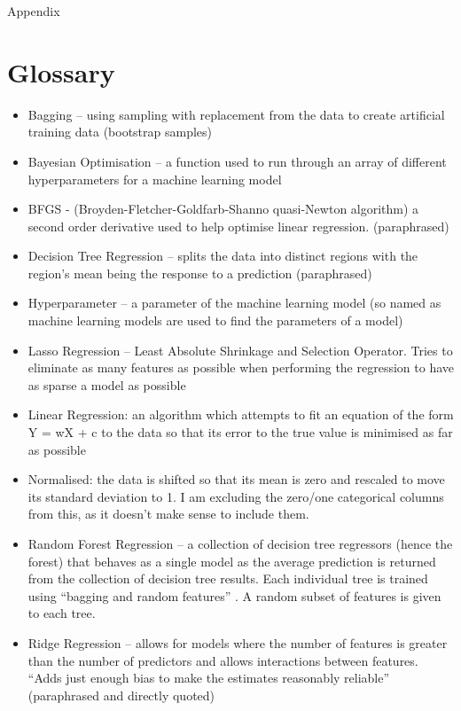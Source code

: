 \documentclass[a4paper,12pt]{article}
\begin{document}
Appendix

\section{Glossary}
\begin{itemize}
	\item Bagging – using sampling with replacement from the data to create artificial training data (bootstrap samples)
	\item Bayesian Optimisation – a function used to run through an array of different hyperparameters for a machine learning model
	\item BFGS - (Broyden-Fletcher-Goldfarb-Shanno quasi-Newton algorithm) a second order derivative used to help optimise linear regression.\citep{brownlee_gentle_2021} (paraphrased)
	\item Decision Tree Regression – splits the data into distinct regions with the region’s mean being the response to a prediction \citep{james_gareth_introduction_2021} (paraphrased)
	\item Hyperparameter – a parameter of the machine learning model (so named as machine learning models are used to find the parameters of a model)
	\item Lasso Regression – Least Absolute Shrinkage and Selection Operator. Tries to eliminate as many features as possible when performing the regression to have as sparse a model as possible \citep{stephanie_lasso_2015}
	\item Linear Regression: an algorithm which attempts to fit an equation of the form Y = wX + c to the data so that its error to the true value is minimised as far as possible
	\item Normalised: the data is shifted so that its mean is zero and rescaled to move its standard deviation to 1. I am excluding the zero/one categorical columns from this, as it doesn’t make sense to include them.
	\item Random Forest Regression – a collection of decision tree regressors (hence the forest) that behaves as a single model as the average prediction is returned from the collection of decision tree results. Each individual tree is trained using “bagging and random features” \citep{schapire_robert_random_2001}. A random subset of features is given to each tree.
	\item Ridge Regression – allows for models where the number of features is greater than the number of predictors and allows interactions between features. “Adds just enough bias to make the estimates reasonably reliable” \citep{stephanie_ridge_2017} (paraphrased and directly quoted) 
\end{itemize}
\end{document}
